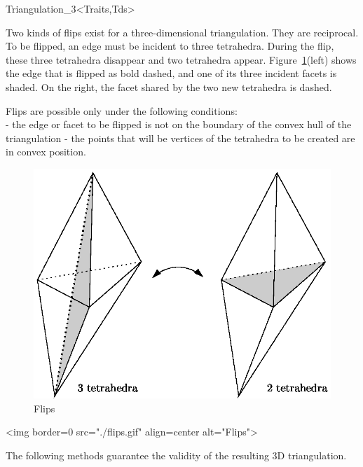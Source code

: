 \begin{ccClassTemplate}{Triangulation_3<Traits,Tds>}

Two kinds of flips exist for a three-dimensional triangulation. They
are reciprocal. To be flipped, an edge must be incident to three
tetrahedra. During the flip, these three tetrahedra disappear and two
tetrahedra appear. Figure~\ref{Triangulation3-fig-flips}(left) shows the
edge that is flipped as bold dashed, and one of its three incident
facets is shaded. On the right, the facet shared by the two new
tetrahedra is dashed. 

Flips are possible only under the following conditions:\\
- the edge or facet to be flipped is not on the boundary of the convex
hull of the triangulation 
- the points that will be vertices of the tetrahedra to be created are 
in convex position.

\begin{ccTexOnly}
\begin{figure}
\begin{center} 
\includegraphics{flips.eps}
\end{center}
\caption{Flips \label{Triangulation3-fig-flips}}
\end{figure} 
\end{ccTexOnly}

\begin{ccHtmlOnly}
<img border=0 src="./flips.gif" align=center
alt="Flips">
\end{ccHtmlOnly}

The following methods guarantee the validity of the resulting 3D
triangulation.


\end{ccClassTemplate}
